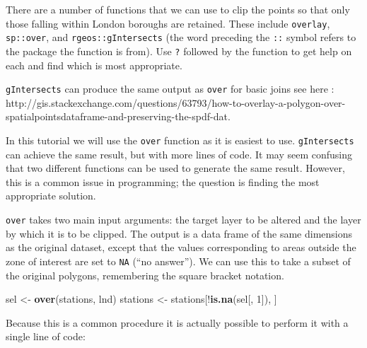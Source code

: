 \documentclass[]{article}
\newenvironment{Shaded}{}{}
\newcommand{\KeywordTok}[1]{\textcolor[rgb]{0.00,0.44,0.13}{\textbf{{#1}}}}
\newcommand{\DecValTok}[1]{\textcolor[rgb]{0.25,0.63,0.44}{{#1}}}
\newcommand{\NormalTok}[1]{{#1}}
\begin{document}
There are a number of functions that we can use to clip the points so
that only those falling within London boroughs are retained. These
include \texttt{overlay}, \texttt{sp::over}, and
\texttt{rgeos::gIntersects} (the word preceding the \texttt{::} symbol
refers to the package the function is from). Use \texttt{?} followed by
the function to get help on each and find which is most appropriate.

\texttt{gIntersects} can produce the same output as \texttt{over} for
basic joins see here :
http://gis.stackexchange.com/questions/63793/how-to-overlay-a-polygon-over-spatialpointsdataframe-and-preserving-the-spdf-dat.

In this tutorial we will use the \texttt{over} function as it is easiest
to use. \texttt{gIntersects} can achieve the same result, but with more
lines of code. It may seem confusing that two different functions can be
used to generate the same result. However, this is a common issue in
programming; the question is finding the most appropriate solution.

\texttt{over} takes two main input arguments: the target layer to be
altered and the layer by which it is to be clipped. The output is a data
frame of the same dimensions as the original dataset, except that the
values corresponding to areas outside the zone of interest are set to
\texttt{NA} (``no answer''). We can use this to take a subset of the
original polygons, remembering the square bracket notation.

\begin{Shaded}
\begin{Highlighting}[]
\NormalTok{sel <- }\KeywordTok{over}\NormalTok{(stations, lnd)}
\NormalTok{stations <- stations[!}\KeywordTok{is.na}\NormalTok{(sel[, }\DecValTok{1}\NormalTok{]), ]}
\end{Highlighting}
\end{Shaded}
Because this is a common procedure it is actually possible to perform it
with a single line of code:
\end{document}
